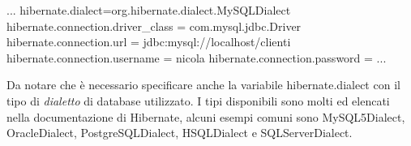 \begin{bash}
...
hibernate.dialect=org.hibernate.dialect.MySQLDialect
hibernate.connection.driver_class = com.mysql.jdbc.Driver
hibernate.connection.url = jdbc:mysql://localhost/clienti
hibernate.connection.username = nicola
hibernate.connection.password = 
...
\end{bash}

Da notare che è necessario specificare anche la variabile hibernate.dialect con il tipo di \emph{dialetto} di database utilizzato. I tipi disponibili sono molti ed elencati nella documentazione di Hibernate, alcuni esempi comuni sono MySQL5Dialect, OracleDialect, PostgreSQLDialect, HSQLDialect e SQLServerDialect.



